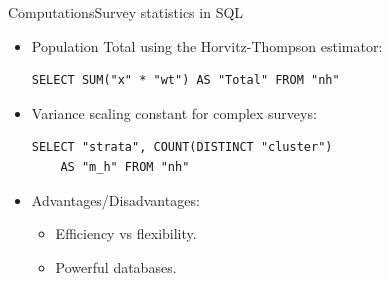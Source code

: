 \documentclass{beamer}
\begin{document}
\begin{frame}[fragile]{Computations}{Survey statistics in SQL}

  \begin{itemize}
  \item {
    Population Total using the Horvitz-Thompson estimator:\\
    \begin{lstlisting}
SELECT SUM("x" * "wt") AS "Total" FROM "nh"
    \end{lstlisting}
  }
  
  \pause
  
  \item {
    Variance scaling constant for complex surveys:\\
    \begin{lstlisting}
SELECT "strata", COUNT(DISTINCT "cluster") 
    AS "m_h" FROM "nh"
    \end{lstlisting}
  }
  
  \pause
  
   \item {Advantages/Disadvantages:\\
     \begin{itemize}
  \item {
        Efficiency vs flexibility.
  }
  \item {
        Powerful databases.
  }
  \end{itemize}
  }
  \end{itemize}

\end{frame}
\end{document}
